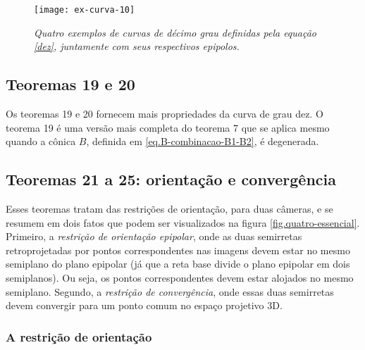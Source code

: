 \begin{figure}[!htb]
\centering
\texttt{[image: ex-curva-10]}
\caption{\textit{Quatro exemplos de curvas de décimo grau definidas pela equação \ref{dez}, juntamente com seus respectivos epipolos.}}
\label{curva-10}
\end{figure}

\subsection*{Teoremas 19 e 20}

Os teoremas 19 e 20 fornecem mais propriedades da curva de grau dez. O teorema 19 é uma versão mais completa do teorema 7 que se aplica mesmo quando a cônica $B$, definida em \ref{eq.B-combinacao-B1-B2}, é degenerada.

\subsection{Teoremas 21 a 25: orientação e convergência}

Esses teoremas tratam das restrições de orientação, para duas câmeras, e se resumem em dois fatos que podem ser visualizados na figura \ref{fig.quatro-essencial}. Primeiro, a {\it restrição de orientação epipolar}, onde as duas semirretas retroprojetadas por pontos correspondentes nas imagens devem estar no mesmo semiplano do plano epipolar (já que a reta base divide o plano epipolar em dois semiplanos). Ou seja, os pontos correspondentes devem estar alojados no mesmo semiplano. Segundo, a {\it restrição de convergência}, onde essas duas semirretas devem convergir para um ponto comum no espaço projetivo 3D.  

\subsubsection{A restrição de orientação}

